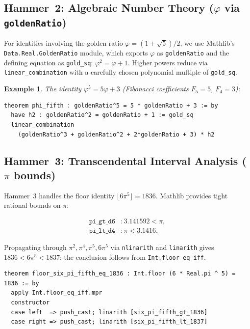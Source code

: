 \documentclass[11pt,a4paper]{article}
\newtheorem{example}[theorem]{Example}
\begin{document}
\subsection{Hammer~2: Algebraic Number Theory ($\varphi$ via \texttt{goldenRatio})}

For identities involving the golden ratio $\varphi = (1+\sqrt{5})/2$,
we use Mathlib's \texttt{Data.Real.GoldenRatio} module, which exports
$\varphi$ as \texttt{goldenRatio} and the defining equation as \texttt{gold\_sq}:
$\varphi^2 = \varphi + 1$.  Higher powers reduce via
\texttt{linear\_combination} with a carefully chosen polynomial multiple
of \texttt{gold\_sq}.

\begin{example}
The identity $\varphi^5 = 5\varphi + 3$ (Fibonacci coefficients
$F_5=5$, $F_4=3$):
\begin{lstlisting}
theorem phi_fifth : goldenRatio^5 = 5 * goldenRatio + 3 := by
  have h2 : goldenRatio^2 = goldenRatio + 1 := gold_sq
  linear_combination
    (goldenRatio^3 + goldenRatio^2 + 2*goldenRatio + 3) * h2
\end{lstlisting}
\end{example}

\subsection{Hammer~3: Transcendental Interval Analysis ($\pi$ bounds)}

Hammer~3 handles the floor identity
$\lfloor 6\pi^5 \rfloor = 1836$.  Mathlib provides tight
rational bounds on $\pi$:

\begin{align}
  \texttt{pi\_gt\_d6} &: 3.141592 < \pi, \\
  \texttt{pi\_lt\_d4} &: \pi < 3.1416.
\end{align}

Propagating through $\pi^2,\pi^4,\pi^5,6\pi^5$ via \texttt{nlinarith}
and \texttt{linarith} gives $1836 < 6\pi^5 < 1837$; the conclusion
follows from \texttt{Int.floor\_eq\_iff}.

\begin{lstlisting}
theorem floor_six_pi_fifth_eq_1836 : Int.floor (6 * Real.pi ^ 5) = 1836 := by
  apply Int.floor_eq_iff.mpr
  constructor
  case left  => push_cast; linarith [six_pi_fifth_gt_1836]
  case right => push_cast; linarith [six_pi_fifth_lt_1837]
\end{lstlisting}
\end{document}
